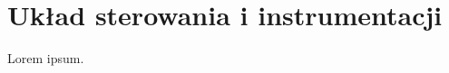 \chapter{Układ sterowania i instrumentacji}
\label{cha:ch3_uklad_ster_i_instrumentacji}

Lorem ipsum.

